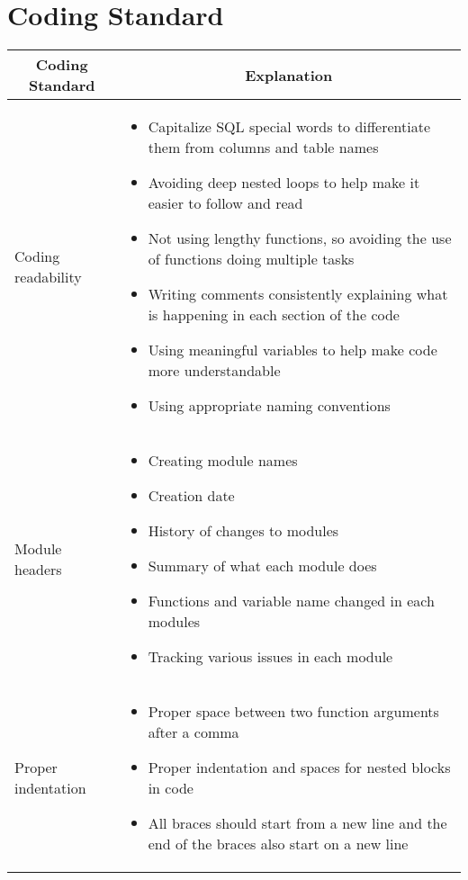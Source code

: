 \documentclass{article}
\begin{document}
\section{Coding Standard}

\begin{table}[H]
	\centering
	\begin{tabular}{|p{4cm}|p{8cm}|}
	\hline
	\multicolumn{1}{|c|}{\textbf{Coding Standard}} & \multicolumn{1}{c|}{\textbf{Explanation}} 
	\\ \hline
	Coding readability
	&  
	\begin{itemize}
		\item Capitalize SQL special words to differentiate them from columns and table names
		\item Avoiding deep nested loops to help make it easier to follow and read
		\item Not using lengthy functions, so avoiding the use of functions doing multiple tasks
		\item Writing comments consistently explaining what is happening in each section of the code
		\item Using meaningful variables to help make code more understandable
		\item Using appropriate naming conventions
	\end{itemize}                                 
	\\ \hline
	Module headers
	&  
	\begin{itemize}
		\item Creating module names
		\item Creation date
		\item History of changes to modules
		\item Summary of what each module does
		\item Functions and variable name changed in each modules
		\item Tracking various issues in each module
	\end{itemize} 
                             
	\\ \hline
	Proper indentation
	&
	\begin{itemize}
		\item Proper space between two function arguments after a comma
		\item Proper indentation and spaces for nested blocks in code
		\item All braces should start from a new line and the end of the braces also start on a new line
	\end{itemize}
	                             
	\\ \hline
	\end{tabular}
\end{table}
\end{document}
